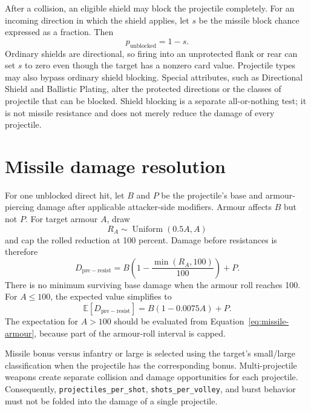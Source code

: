 \documentclass[11pt]{article}
\begin{document}
After a collision, an eligible shield may block the projectile completely.
For an incoming direction in which the shield applies, let $s$ be the missile
block chance expressed as a fraction.  Then
\begin{equation}
  p_{\mathrm{unblocked}} = 1-s.
  \label{eq:missile-unblocked}
\end{equation}
Ordinary shields are directional, so firing into an unprotected flank or rear
can set $s$ to zero even though the target has a nonzero card value.  Projectile
types may also bypass ordinary shield blocking.  Special attributes, such as
Directional Shield and Ballistic Plating, alter the protected directions or
the classes of projectile that can be blocked.  Shield blocking is a separate
all-or-nothing test; it is not missile resistance and does not merely reduce
the damage of every projectile.

\section{Missile damage resolution}

For one unblocked direct hit, let $B$ and $P$ be the projectile's base and
armour-piercing damage after applicable attacker-side modifiers.  Armour
affects $B$ but not $P$.  For target armour $A$, draw
\begin{equation}
  R_A \sim \operatorname{Uniform}(0.5A,A)
\end{equation}
and cap the rolled reduction at 100 percent.  Damage before resistances is
therefore
\begin{equation}
  D_{\mathrm{pre-resist}}
  = B\left(1-\frac{\min(R_A,100)}{100}\right)+P.
  \label{eq:missile-armour}
\end{equation}
There is no minimum surviving base damage when the armour roll reaches 100.
For $A\leq100$, the expected value simplifies to
\begin{equation}
  \mathbb{E}[D_{\mathrm{pre-resist}}]
  = B(1-0.0075A)+P.
  \label{eq:missile-armour-expectation}
\end{equation}
The expectation for $A>100$ should be evaluated from
Equation~\ref{eq:missile-armour}, because part of the armour-roll interval is
capped.

Missile bonus versus infantry or large is selected using the target's
small/large classification when the projectile has the corresponding bonus.
Multi-projectile weapons create separate collision and damage opportunities
for each projectile.  Consequently,
\texttt{projectiles\_\allowbreak per\_\allowbreak shot},
\texttt{shots\_\allowbreak per\_\allowbreak volley}, and burst behavior must not be folded into the
damage of a single projectile.
\end{document}
